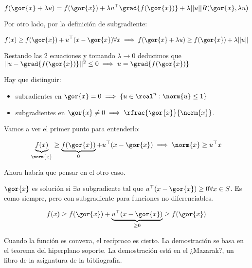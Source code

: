 \begin{problem}[10]
\[
    f(\gor{x}+\lambda u) = f(\gor{x}) + \lambda u^\top \grad{f(\gor{x})} + \lambda ||u||R(\gor{x},\lambda u)
\]

Por otro lado, por la definición de subgradiente:

\[
    f(x) \geq f(\gor{x}) + u^\top (x-\gor{x}) \forall x \implies f(\gor{x} + \lambda u) \geq f(\gor{x}) + \lambda ||u||
\]

Restando las 2 ecuaciones y tomando $\lambda \to 0$ deducimos que $||u - \grad{f(\gor{x})}||^2 \leq 0 \implies u = \grad{f(\gor{x})}$

\spart

Hay que distinguir:
\begin{itemize}
 \item subradientes en $\gor{x} = 0 \implies \{u\in \real^n : \norm{u}\leq 1\}$
 \item subgradientes en $\gor{x} \neq 0\implies \rfrac{\gor{x}}{\norm{x}}$.
\end{itemize}

Vamos a ver el primer punto para entenderlo:

\[
    \underbrace{f(x)}_{\norm{x}}\geq \underbrace{f(\gor{x})}_{0} + u^\top (x-\gor{x}) \implies \norm{x} \geq u^\top x
\]

Ahora habría que pensar en el otro caso.

\spart

$\gor{x}$ es solución si $\exists u$ subgradiente tal que $u^\top (x-\gor{x}) \geq 0 \forall x\in S$.
%
Es como siempre, pero con subgradiente para funciones no diferenciables.

\[
    f(x) \geq f(\gor{x}) + \underbrace{u^\top(x-\gor{x})}_{\geq0} \geq f(\gor{x})
\]

Cuando la función es convexa, el recíproco es cierto.
%
La demostración se basa en el teorema del hiperplano soporte.
%
La demostración está en el ¿Mazarak?, un libro de la asignatura de la bibliografía.

\end{problem}



